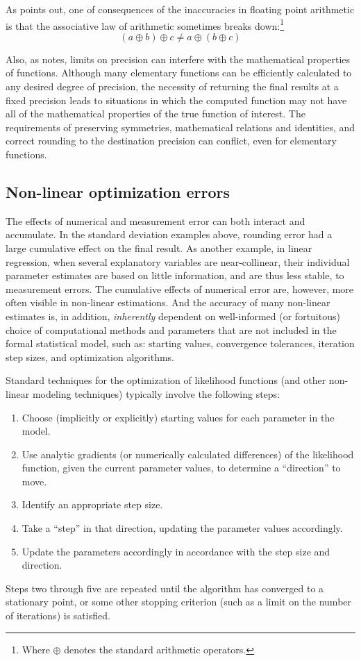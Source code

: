 \documentclass[11pt]{article}
\begin{document}
As \citet[page 229]{Knuth97} points out, one of consequences of the inaccuracies in floating point 
arithmetic is that the associative law of arithmetic sometimes breaks 
	down:\footnote{Where $\oplus$ denotes the standard arithmetic operators.}
\begin{equation}
    \left( a\oplus b\right) \oplus c\neq a\oplus \left( b\oplus c\right)
\end{equation}

 Also, as \citet[Section 2.10]{Higham02} 
notes, limits on precision can interfere with the mathematical properties of functions. Although 
many elementary functions can be efficiently calculated to any desired degree of precision, the 
necessity of returning the final results at a fixed precision leads to situations in which the 
computed function may not have all of the mathematical properties of the true function of interest. 
The requirements of preserving symmetries, mathematical relations and identities, and correct 
rounding to the destination precision can conflict, even for elementary functions.

\subsection{Non-linear optimization errors} 
The effects of numerical and measurement error can both interact and accumulate. In the standard 
deviation examples above, rounding error had a large cumulative effect on the final result. As another example, in 
linear regression, when several explanatory variables are near-collinear, their individual parameter estimates are based on little information, and are thus less stable, to measurement errors. The cumulative effects of numerical error are, however, more often 
visible in non-linear estimations. And the accuracy of many non-linear estimates
is, in addition, \emph{inherently} dependent on well-informed (or fortuitous)
choice of computational methods and parameters that are not included in the formal statistical model, 
such as: starting values, convergence tolerances, iteration step sizes, and optimization algorithms. 

Standard techniques for the optimization of likelihood functions (and other non-linear modeling 
techniques) typically involve the following steps: 
\begin{enumerate}
	\item	Choose (implicitly or explicitly) starting values for each parameter in the model.
	\item	Use analytic gradients (or numerically calculated differences) of the 
		likelihood function, given the current parameter values, to determine a 
		``direction'' to move. 
	\item Identify an appropriate step size.
	\item	Take a ``step'' in that direction, updating the parameter values accordingly.
	\item	Update the parameters accordingly in accordance with the step size and direction.
\end{enumerate}
Steps two through five are repeated until the algorithm has converged to a stationary 
point, or some other stopping criterion (such as a limit on the number of iterations) is satisfied. 
\end{document}
